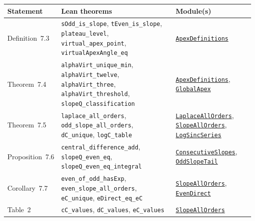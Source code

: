 \documentclass[11pt,a4paper]{article}
\newcommand{\R}{https://github.com/ralfanop/Certifications_Eulerian_polar-curve_computations}
\newcommand{\A}{\R/blob/main/certifications/manuscript15}
\begin{document}
{\small\raggedright
\begin{longtable}{@{}>{\raggedright\arraybackslash}p{}>{\raggedright\arraybackslash}p{}>{\raggedright\arraybackslash}p{}@{}}
\toprule
Statement & Lean theorems & Module(s)\\
\midrule
\endhead
\bottomrule
\endfoot

Definition~7.3 & \texttt{sOdd\_\allowbreak is\_\allowbreak slope}, \texttt{tEven\_\allowbreak is\_\allowbreak slope}, \texttt{plateau\_\allowbreak level}, \texttt{virtual\_\allowbreak apex\_\allowbreak point}, \texttt{virtualApexAngle\_\allowbreak eq} & \href{\A/LEAN/PrivateApex/ApexDefinitions.lean}{\texttt{ApexDefinitions}}\\
Theorem~7.4 & \texttt{alphaVirt\_\allowbreak unique\_\allowbreak min}, \texttt{alphaVirt\_\allowbreak twelve}, \texttt{alphaVirt\_\allowbreak three}, \texttt{alphaVirt\_\allowbreak threshold}, \texttt{slopeQ\_\allowbreak classification} & \href{\A/LEAN/PrivateApex/ApexDefinitions.lean}{\texttt{ApexDefinitions}}, \href{\A/LEAN/PrivateApex/GlobalApex.lean}{\texttt{GlobalApex}}\\
Theorem~7.5 & \texttt{laplace\_\allowbreak all\_\allowbreak orders}, \texttt{odd\_\allowbreak slope\_\allowbreak all\_\allowbreak orders}, \texttt{dC\_\allowbreak unique}, \texttt{logC\_\allowbreak table} & \href{\A/LEAN/PrivateApex/LaplaceAllOrders.lean}{\texttt{LaplaceAllOrders}}, \href{\A/LEAN/PrivateApex/SlopeAllOrders.lean}{\texttt{SlopeAllOrders}}, \href{\A/LEAN/PrivateApex/LogSincSeries.lean}{\texttt{LogSincSeries}}\\
Proposition~7.6 & \texttt{central\_\allowbreak difference\_\allowbreak add}, \texttt{slopeQ\_\allowbreak even\_\allowbreak eq}, \texttt{slopeQ\_\allowbreak even\_\allowbreak eq\_\allowbreak integral} & \href{\A/LEAN/PrivateApex/ConsecutiveSlopes.lean}{\texttt{ConsecutiveSlopes}}, \href{\A/LEAN/PrivateApex/OddSlopeTail.lean}{\texttt{OddSlopeTail}}\\
Corollary~7.7 & \texttt{even\_\allowbreak of\_\allowbreak odd\_\allowbreak hasExp}, \texttt{even\_\allowbreak slope\_\allowbreak all\_\allowbreak orders}, \texttt{eC\_\allowbreak unique}, \texttt{eDirect\_\allowbreak eq\_\allowbreak eC} & \href{\A/LEAN/PrivateApex/SlopeAllOrders.lean}{\texttt{SlopeAllOrders}}, \href{\A/LEAN/PrivateApex/EvenDirect.lean}{\texttt{EvenDirect}}\\
Table~2 & \texttt{cC\_\allowbreak values}, \texttt{dC\_\allowbreak values}, \texttt{eC\_\allowbreak values} & \href{\A/LEAN/PrivateApex/SlopeAllOrders.lean}{\texttt{SlopeAllOrders}}\\

\end{longtable}}
\end{document}
